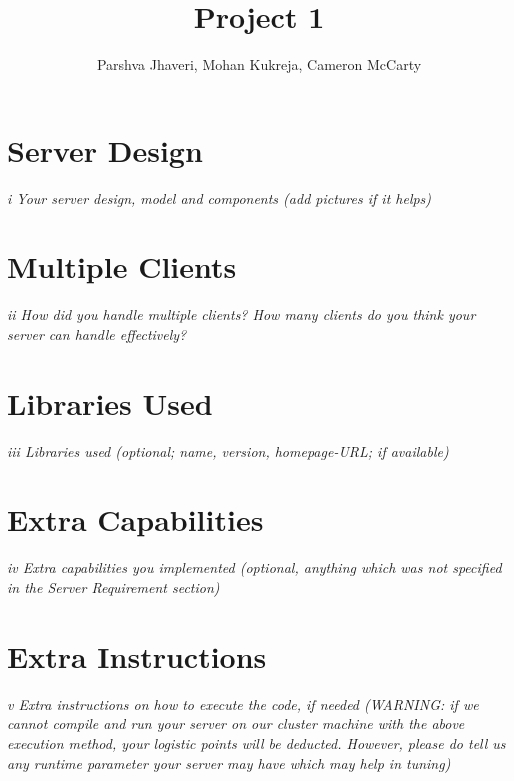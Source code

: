 \documentclass[11pt, letterpaper]{report}
\title{Project 1}
\author{Parshva Jhaveri, Mohan Kukreja, Cameron McCarty}
\begin{document}
\maketitle

\section{Server Design}
\textit{i Your server design, model and components (add pictures if it helps)}

\section{Multiple Clients}
\textit{ii How did you handle multiple clients? How many clients do you think your server can handle effectively?}

\section{Libraries Used}
\textit{iii Libraries used (optional; name, version, homepage-URL; if available)}

\section{Extra Capabilities}
\textit{iv Extra capabilities you implemented (optional, anything which was not specified in the Server Requirement section)}

\section{Extra Instructions}
\textit{v Extra instructions on how to execute the code, if needed (WARNING: if we cannot compile and run your server on our cluster machine with the above execution method, your logistic points will be deducted. However, please do tell us any runtime parameter your server may have which may help in tuning)}
\end{document}
